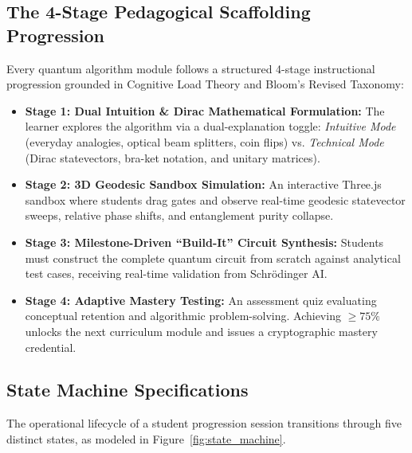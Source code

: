 \documentclass[11pt, a4paper]{article}
\begin{document}
\subsection{The 4-Stage Pedagogical Scaffolding Progression}
Every quantum algorithm module follows a structured 4-stage instructional progression grounded in Cognitive Load Theory and Bloom's Revised Taxonomy:
\begin{itemize}
	\item \textbf{Stage 1: Dual Intuition \& Dirac Mathematical Formulation:} The learner explores the algorithm via a dual-explanation toggle: \textit{Intuitive Mode} (everyday analogies, optical beam splitters, coin flips) vs. \textit{Technical Mode} (Dirac statevectors, bra-ket notation, and unitary matrices).
	\item \textbf{Stage 2: 3D Geodesic Sandbox Simulation:} An interactive Three.js sandbox where students drag gates and observe real-time geodesic statevector sweeps, relative phase shifts, and entanglement purity collapse.
	\item \textbf{Stage 3: Milestone-Driven ``Build-It'' Circuit Synthesis:} Students must construct the complete quantum circuit from scratch against analytical test cases, receiving real-time validation from Schr{\"o}dinger AI.
	\item \textbf{Stage 4: Adaptive Mastery Testing:} An assessment quiz evaluating conceptual retention and algorithmic problem-solving. Achieving $\ge 75\%$ unlocks the next curriculum module and issues a cryptographic mastery credential.
\end{itemize}

\subsection{State Machine Specifications}
The operational lifecycle of a student progression session transitions through five distinct states, as modeled in Figure~\ref{fig:state_machine}.
\end{document}
